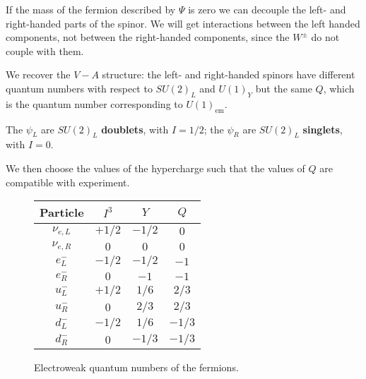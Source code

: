 \documentclass[main.tex]{subfiles}
\begin{document}

If the mass of the fermion described by \(\Psi \) is zero we can decouple the left- and right-handed parts of the spinor. 
We will get interactions between the left handed components, not between the right-handed components, since the \(W^{\pm}\) do not couple with them.

We recover the \(V-A\) structure: the left- and right-handed spinors have different quantum numbers with respect to \(SU(2)_L\) and \(U(1)_Y\) but the same \(Q\), which is the quantum number corresponding to \(U(1)_{\text{em}}\). 

The \(\psi_{L}\) are \(SU(2)_L\) \textbf{doublets}, with \(I = 1/2\); the \(\psi_{R}\) are \(SU(2)_L\) \textbf{singlets}, with \(I = 0\).

We then choose the values of the hypercharge such that the values of \(Q\) are compatible with experiment. 

\begin{figure}[H]
\centering
\begin{tabular}{cccc}
Particle & \(I^{3}\) & \(Y\) & \(Q\)\\
\hline
\(\nu_{e, L}\) & \(+ 1 /2\) & \(- 1/2\)& \(0\) \\
\(\nu_{e, R}\) & \(0\) & \(0\)& \(0\) \\
\(e^-_{L}\) & \(- 1 /2\) & \(- 1/2\)& \(-1\) \\
\(e^-_{R}\) & \(0\) & \(-1\)& \(-1\) \\
\(u^-_{L}\) & \(+ 1 /2\) & \(1/6\)& \(2/3\) \\
\(u^-_{R}\) & \(0\) & \(2/3\)& \(2/3\) \\
\(d^-_{L}\) & \(-1 /2\) & \(1/6\)& \(-1/3\) \\
\(d^-_{R}\) & \(0\) & \(-1/3\)& \(-1/3\) \\
\end{tabular}
\label{tab:fermions-quantum-numbers}
\caption{Electroweak quantum numbers of the fermions.}
\end{figure}

\end{document}
